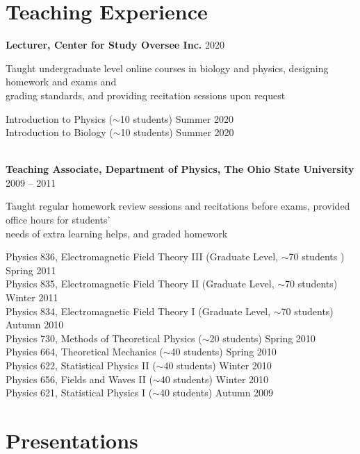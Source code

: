 \documentclass[11pt]{../yhlcv}
\begin{document}
\section*{Teaching Experience}

{\bf Lecturer, Center for Study Oversee Inc. } \hfill 2020 \vspace{0.5em}

Taught undergraduate level online courses in biology and physics, designing homework and exams
and \\ grading standards, and providing recitation sessions upon request  \vspace{0.5em}

Introduction to Physics ($\sim$10 students) \hfill Summer 2020 \\
Introduction to Biology ($\sim$10 students) \hfill Summer 2020 \\

\ \

{\bf Teaching Associate, Department of Physics, The Ohio State University} \hfill 2009 -- 2011\vspace{0.5em}

Taught regular homework review sessions and recitations before exams, provided office hours
for students' \\ needs of extra learning helps, and graded homework \vspace{0.5em}

Physics 836, Electromagnetic Field Theory III (Graduate Level, $\sim$70 students ) \hfill Spring 2011\\
Physics 835, Electromagnetic Field Theory II (Graduate Level, $\sim$70 students) \hfill  Winter 2011 \\
Physics 834, Electromagnetic Field Theory I (Graduate Level, $\sim$70 students) \hfill Autumn 2010 \\
Physics 730, Methods of Theoretical Physics ($\sim$20 students) \hfill Spring 2010 \\
Physics 664, Theoretical Mechanics ($\sim$40 students) \hfill Spring 2010 \\
Physics 622, Statistical Physics II ($\sim$40 students) \hfill Winter 2010 \\
Physics 656, Fields and Waves II ($\sim$40 students) \hfill Winter 2010 \\
Physics 621, Statistical Physics I ($\sim$40 students) \hfill Autumn 2009

\section*{Presentations}
\end{document}

